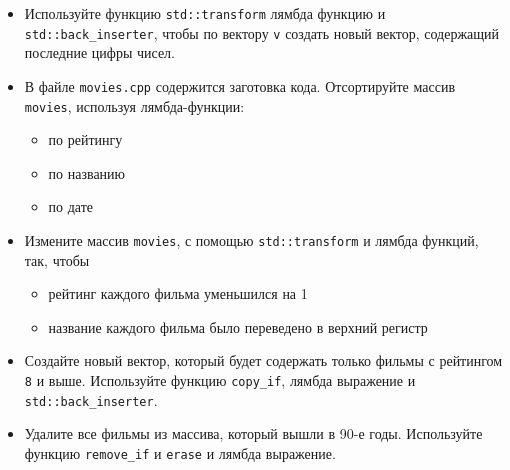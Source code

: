 \documentclass{article}
\begin{document}
\begin{itemize}
\item Используйте функцию \texttt{std::transform} лямбда функцию и \texttt{std::back\_inserter}, чтобы по вектору \texttt{v} создать новый вектор, содержащий последние цифры чисел.
\item В файле \texttt{movies.cpp} содержится заготовка кода. Отсортируйте массив \texttt{movies}, используя лямбда-функции:
\begin{itemize}
\item по рейтингу
\item по названию
\item по дате
\end{itemize}
\item Измените массив \texttt{movies}, с помощью \texttt{std::transform} и лямбда функций, так, чтобы
\begin{itemize}
\item рейтинг каждого фильма уменьшился на 1
\item название каждого фильма было переведено в верхний регистр
\end{itemize}

\item Создайте новый вектор, который будет содержать только фильмы с рейтингом \texttt{8} и выше. Используйте функцию \texttt{copy\_if}, лямбда выражение и \texttt{std::back\_inserter}.

\item Удалите все фильмы из массива, который вышли в 90-е годы. Используйте функцию \texttt{remove\_if} и \texttt{erase} и лямбда выражение.
\end{itemize}
\end{document}
